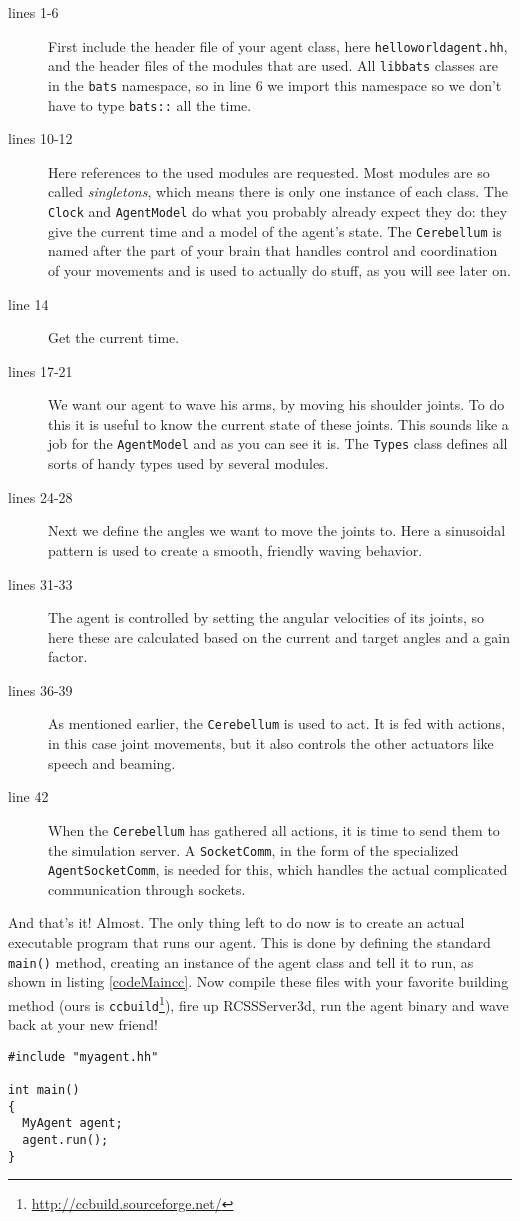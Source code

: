 \begin{description}
\item[lines 1-6] First include the header file of your agent class, here {\tt helloworldagent.hh}, and the header files of the modules that are used. All {\tt libbats} classes are in the {\tt bats} namespace, so in line 6 we import this namespace so we don't have to type {\tt bats::} all the time.
\item[lines 10-12] Here references to the used modules are requested. Most modules are so called \emph{singletons}, which means there is only one instance of each class. The {\tt Clock} and {\tt AgentModel} do what you probably already expect they do: they give the current time and a model of the agent's state. The {\tt Cerebellum} is named after the part of your brain that handles control and coordination of your movements and is used to actually do stuff, as you will see later on.
\item[line 14] Get the current time.
\item[lines 17-21] We want our agent to wave his arms, by moving his shoulder joints. To do this it is useful to know the current state of these joints. This sounds like a job for the {\tt AgentModel} and as you can see it is. The {\tt Types} class defines all sorts of handy types used by several modules.
\item[lines 24-28] Next we define the angles we want to move the joints to. Here a sinusoidal pattern is used to create a smooth, friendly waving behavior.
\item[lines 31-33] The agent is controlled by setting the angular velocities of its joints, so here these are calculated based on the current and target angles and a gain factor.
\item[lines 36-39] As mentioned earlier, the {\tt Cerebellum} is used to act. It is fed with actions, in this case joint movements, but it also controls the other actuators like speech and beaming.
\item[line 42] When the {\tt Cerebellum} has gathered all actions, it is time to send them to the simulation server. A {\tt SocketComm}, in the form of the specialized {\tt AgentSocketComm}, is needed for this, which handles the actual complicated communication through sockets.
\end{description}

And that's it! Almost. The only thing left to do now is to create an actual executable program that runs our agent. This is done by defining the standard {\tt main()} method, creating an instance of the agent class and tell it to run, as shown in listing \ref{codeMaincc}. Now compile these files with your favorite building method (ours is {\tt ccbuild}\footnote{\url{http://ccbuild.sourceforge.net/}}), fire up RCSSServer3d, run the agent binary and wave back at your new friend!

\begin{lstlisting}[float,caption={\tt main.cc},label=codeMaincc,frame=single]
#include "myagent.hh"

int main()
{
  MyAgent agent;
  agent.run();
}
\end{lstlisting}
